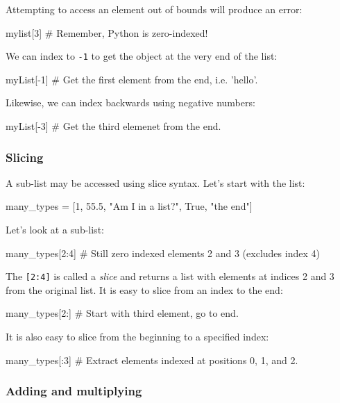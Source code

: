 \documentclass[12pt]{article} \newif\ifsolution\solutiontrue %
\begin{document}
Attempting to access an element out of bounds will produce an error:

\begin{python}
mylist[3]  # Remember, Python is zero-indexed!
\end{python}

We can index to \texttt{-1} to get the object at the very end of the list:

\begin{python}
myList[-1]  # Get the first element from the end, i.e. 'hello'.
\end{python}

Likewise, we can index backwards using negative numbers:

\begin{python}
myList[-3]  # Get the third elemenet from the end.
\end{python}

\subsubsection{Slicing}\label{slicing}

A sub-list may be accessed using slice syntax. Let's start with the
list:

\begin{python}
many_types = [1, 55.5, "Am I in a list?", True, "the end"]
\end{python}

Let's look at a sub-list:

\begin{python}
many_types[2:4]  # Still zero indexed elements 2 and 3 (excludes index 4)
\end{python}

The \texttt{{[}2:4{]}} is called a \emph{slice} and returns a list with
elements at indices 2 and 3 from the original list.
It is easy to slice from an index to the end:

\begin{python}
many_types[2:]  # Start with third element, go to end.
\end{python}

It is also easy to slice from the beginning to a specified index:

\begin{python}
many_types[:3]  # Extract elements indexed at positions 0, 1, and 2.
\end{python}

\subsubsection{Adding and multiplying}\label{adding-and-multiplying}
\end{document}
